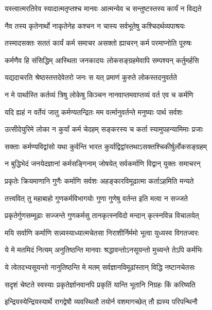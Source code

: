 \twolineshloka
{यस्त्वात्मरतिरेव स्यादात्मतृप्तश्च मानवः}
{आत्मन्येव च सन्तुष्टस्तस्य कार्यं न विद्यते}%

\twolineshloka
{नैव तस्य कृतेनार्थो नाकृतेनेह कश्चन}
{न चास्य सर्वभूतेषु कश्चिदर्थव्यपाश्रयः}%

\twolineshloka
{तस्मादसक्तः सततं कार्यं कर्म समाचर}
{असक्तो ह्याचरन् कर्म परमाप्नोति पूरुषः}%

\twolineshloka
{कर्मणैव हि संसिद्धिम् आस्थिता जनकादयः}
{लोकसङ्ग्रहमेवापि सम्पश्यन् कर्तुमर्हसि}%

\twolineshloka
{यद्यदाचरति श्रेष्ठस्तत्तदेवेतरो जनः}
{स यत् प्रमाणं कुरुते लोकस्तदनुवर्तते}%

\twolineshloka
{न मे पार्थास्ति कर्तव्यं त्रिषु लोकेषु किञ्चन}
{नानवाप्तमवाप्तव्यं वर्त एव च कर्मणि}%

\twolineshloka
{यदि ह्यहं न वर्तेयं जातु कर्मण्यतन्द्रितः}
{मम वर्त्मानुवर्तन्ते मनुष्याः पार्थ सर्वशः}%

\twolineshloka
{उत्सीदेयुरिमे लोका न कुर्यां कर्म चेदहम्}
{सङ्करस्य च कर्ता स्यामुपहन्यामिमाः प्रजाः}%

\twolineshloka
{सक्ताः कर्मण्यविद्वांसो यथा कुर्वन्ति भारत}
{कुर्याद्विद्वांस्तथाऽसक्तश्चिकीर्षुर्लोकसङ्ग्रहम्}%

\twolineshloka
{न बुद्धिभेदं जनयेदज्ञानां कर्मसङ्गिनाम्}
{जोषयेत् सर्वकर्माणि विद्वान् युक्तः समाचरन्}%

\twolineshloka
{प्रकृतेः क्रियमाणानि गुणैः कर्माणि सर्वशः}
{अहङ्कारविमूढात्मा कर्ताऽहमिति मन्यते}%

\twolineshloka
{तत्त्ववित् तु महाबाहो गुणकर्मविभागयोः}
{गुणा गुणेषु वर्तन्त इति मत्वा न सज्जते}%

\twolineshloka
{प्रकृतेर्गुणसम्मूढाः सज्जन्ते गुणकर्मसु}
{तानकृत्स्नविदो मन्दान् कृत्स्नविन्न विचालयेत्}%

\twolineshloka
{मयि सर्वाणि कर्माणि सन्न्यस्याध्यात्मचेतसा}
{निराशीर्निर्ममो भूत्वा युध्यस्व विगतज्वरः}%

\twolineshloka
{ये मे मतमिदं नित्यम् अनुतिष्ठन्ति मानवाः}
{श्रद्धावन्तोऽनसूयन्तो मुच्यन्ते तेऽपि कर्मभिः}%

\twolineshloka
{ये त्वेतदभ्यसूयन्तो नानुतिष्ठन्ति मे मतम्}
{सर्वज्ञानविमूढांस्तान् विद्धि नष्टानचेतसः}%

\twolineshloka
{सदृशं चेष्टते स्वस्याः प्रकृतेर्ज्ञानवानपि}
{प्रकृतिं यान्ति भूतानि निग्रहः किं करिष्यति}%

\twolineshloka
{इन्द्रियस्येन्द्रियस्यार्थे रागद्वेषौ व्यवस्थितौ}
{तयोर्न वशमागच्छेत् तौ ह्यस्य परिपन्थिनौ}%

